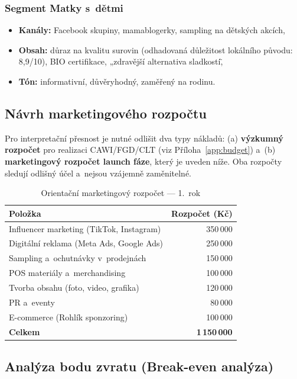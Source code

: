 \subsubsection{Segment Matky s~dětmi}

\begin{itemize}
  \item \textbf{Kanály:} Facebook skupiny, mamablogerky, sampling na dětských akcích,
  \item \textbf{Obsah:} důraz na kvalitu surovin (odhadovaná důležitost lokálního původu: 8,9/10), BIO certifikace, „zdravější alternativa sladkostí\",
  \item \textbf{Tón:} informativní, důvěryhodný, zaměřený na rodinu.
\end{itemize}

\subsection{Návrh marketingového rozpočtu}

Pro interpretační přesnost je nutné odlišit dva typy nákladů: (a) \textbf{výzkumný rozpočet} pro realizaci CAWI/FGD/CLT (viz Příloha~\ref{app:budget}) a~(b) \textbf{marketingový rozpočet launch fáze}, který je uveden níže. Oba rozpočty sledují odlišný účel a~nejsou vzájemně zaměnitelné.

\begin{table}[H]
\centering
\caption{Orientační marketingový rozpočet — 1.\ rok}
\label{tab:budget}
\begin{tabular}{lr}
\toprule
\textbf{Položka} & \textbf{Rozpočet (Kč)} \\
\midrule
Influencer marketing (TikTok, Instagram) & 350\,000 \\
Digitální reklama (Meta Ads, Google Ads) & 250\,000 \\
Sampling a~ochutnávky v~prodejnách & 150\,000 \\
POS materiály a~merchandising & 100\,000 \\
Tvorba obsahu (foto, video, grafika) & 120\,000 \\
PR a~eventy & 80\,000 \\
E-commerce (Rohlík sponzoring) & 100\,000 \\
\midrule
\textbf{Celkem} & \textbf{1\,150\,000} \\
\bottomrule
\end{tabular}
\end{table}

\subsection{Analýza bodu zvratu (Break-even analýza)}

